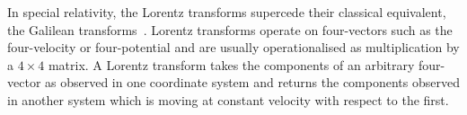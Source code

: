 \documentclass[ijoc,nonblindrev]{informs3} %
\begin{document}
\maketitle

%








\newcommand{\gyr}[2]{\operatorname{gyr}\left[{\mathbf #1},{\mathbf #2}\right]}


In special relativity, the Lorentz transforms supercede their
classical equivalent, the Galilean transforms~\citep{goldstein1980}.
Lorentz transforms operate on four-vectors such as the four-velocity
or four-potential and are usually operationalised as multiplication by
a $4\times 4$ matrix.  A Lorentz transform takes the components of an
arbitrary four-vector as observed in one coordinate system and returns
the components observed in another system which is moving at constant
velocity with respect to the first.
\end{document}
